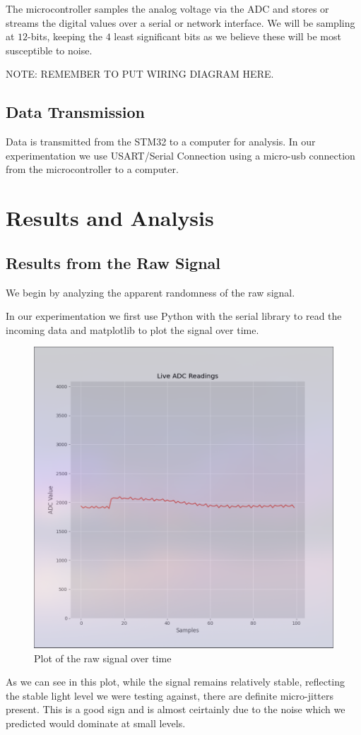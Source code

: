 The microcontroller samples the analog voltage via the ADC and 
stores or 
streams the digital values over a serial or network interface.
We will be sampling at \(12\)-bits, keeping the \(4\) least 
significant bits as we believe these will be most susceptible to 
noise.

NOTE: REMEMBER TO PUT WIRING DIAGRAM HERE.

\subsection{Data Transmission}
Data is transmitted from the STM32 to a computer for analysis. 
In our experimentation we use USART/Serial Connection using 
a micro-usb connection from the microcontroller to a computer.

\newpage
\section{Results and Analysis}
\subsection{Results from the Raw Signal}
We begin by analyzing the apparent randomness 
of the raw signal. 

In our experimentation we first use Python with the serial library 
to read the incoming data and matplotlib to plot the signal 
over time.

\begin{figure}[h]
    \centering
    \includegraphics[width=0.6\linewidth]{./images/RAW_READINGS_PLOT.png} 
    \caption{Plot of the raw signal over time}
    \label{fig:raw_signal_plot} 
\end{figure}

As we can see in this plot, while the signal remains relatively stable,
reflecting the stable light level we were testing against, 
there are definite micro-jitters present. This is a good 
sign and is almost ceirtainly due to the noise which we predicted 
would dominate at small levels.

